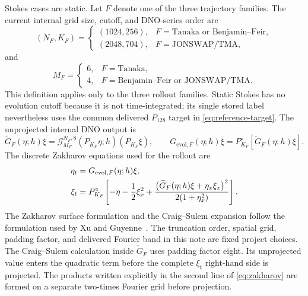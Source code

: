 \documentclass[10pt]{article}
\begin{document}
Stokes cases are static.  Let $F$ denote one of the three trajectory
families.  The current internal grid size, cutoff, and DNO-series order are
\[
  (N_F,K_F)=
  \begin{cases}
    (1024,256),&F=\text{Tanaka or Benjamin--Feir},\\
    (2048,704),&F=\text{JONSWAP/TMA},
  \end{cases}
\]
and
\[
  M_F=
  \begin{cases}
    6,&F=\text{Tanaka},\\
    4,&F=\text{Benjamin--Feir or JONSWAP/TMA}.
  \end{cases}
\]
This definition applies only to the three rollout families.  Static Stokes
has no evolution cutoff because it is not time-integrated; its single stored
label nevertheless uses the common delivered \(P_{128}\) target in
\eqref{eq:reference-target}.
The unprojected internal DNO output is
\[
  \widetilde G_F(\eta;h)\xi
  =
  \mathcal G_{M_F}^{N_F,8}
    (P_{K_F}\eta;h)(P_{K_F}\xi),
  \qquad
  G_{\mathrm{evol},F}(\eta;h)\xi
  =P_{K_F}^{\circ}\!\left[\widetilde G_F(\eta;h)\xi\right].
\]
The discrete Zakharov equations used for the rollout are
\begin{align}
  \eta_t
  &=
  G_{\mathrm{evol},F}(\eta;h)\xi, \notag\\
  \xi_t
  &=
  P_{K_F}^{\circ}\!\left[
    -\eta-\frac12\xi_x^2
    +\frac{
      \bigl(\widetilde G_F(\eta;h)\xi+\eta_x\xi_x\bigr)^2
    }{2(1+\eta_x^2)}
  \right].
  \label{eq:zakharov}
\end{align}
The Zakharov surface formulation and the Craig--Sulem expansion follow the
formulation used by Xu and Guyenne~\cite{xu2009}.  The truncation order,
spatial grid, padding factor, and delivered Fourier band in this note are
fixed project choices.
The Craig--Sulem calculation inside $\widetilde G_F$ uses padding factor
eight.  Its unprojected value enters the quadratic term before the complete
$\xi_t$ right-hand side is projected.  The products written explicitly in the
second line of \eqref{eq:zakharov} are
formed on a separate two-times Fourier grid before projection.
\end{document}
